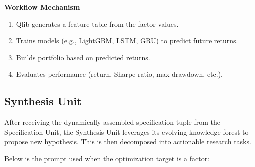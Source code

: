 \documentclass{article}
\begin{document}
\begin{tcolorbox}[
  colback=gray!5, 
  colframe=gray!80,
  title style={fontupper=\bfseries\large},
  title=Specification Prompt – Model-Oriented,
  breakable
]
\vspace{1mm}
\textbf{Workflow Mechanism}
\begin{enumerate}
  \item Qlib generates a feature table from the factor values.
  \item Trains models (e.g., LightGBM, LSTM, GRU) to predict future returns.
  \item Builds portfolio based on predicted returns.
  \item Evaluates performance (return, Sharpe ratio, max drawdown, etc.).
\end{enumerate}

\end{tcolorbox}

\subsection{Synthesis Unit}
After receiving the dynamically assembled specification tuple from the Specification Unit, the Synthesis Unit leverages its evolving knowledge forest to propose new hypothesis. This is then decomposed into actionable research tasks.

Below is the prompt used when the optimization target is a factor:
\end{document}
